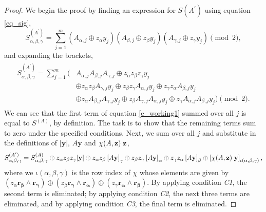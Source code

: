 \documentclass[notitlepage]{article}
\theoremstyle{definition}
\theoremstyle{problem}
\theoremstyle{lemma}
\begin{document}
		\begin{proof}
			We begin the proof by finding an expression for $S(A^\prime)$ using equation \ref{eq_sig},
			\begin{equation}
			S^{(A^\prime)}_{\alpha,\beta,\gamma} = \sum_{j=1}^{m}\left(A_{\alpha,j}\oplus z_\alpha y_j\right)\left(A_{\beta,j}\oplus z_\beta y_j\right)\left(A_{\gamma,j}\oplus z_\gamma y_j\right) \pmod{2},
			\end{equation}
			and expanding the brackets,
			\begin{align}
			\label{e_working1}
			\begin{split}
			S^{(A^\prime)}_{\alpha,\beta,\gamma} = \sum_{j=1}^{m}(&A_{\alpha,j}A_{\beta,j}A_{\gamma,j} \oplus z_\alpha z_\beta z_\gamma y_j  \\			
			&\oplus z_\alpha z_\beta A_{\gamma,j} y_j \oplus z_\beta z_\gamma A_{\alpha,j} y_j \oplus z_\gamma z_\alpha A_{\beta,j} y_j \\
			&\oplus z_\alpha A_{\beta,j} A_{\gamma,j} y_j \oplus z_\beta A_{\gamma,j} A_{\alpha,j} y_j \oplus z_\gamma A_{\alpha,j} A_{\beta,j} y_j) \pmod{2}.
			\end{split}
			\end{align}
			We can see that the first term of equation \ref{e_working1} summed over all $j$ is equal to $S^{(A)}$, by definition. The task is to show that the remaining terms sum to zero under the specified conditions. Next, we sum over all $j$ and substitute in the definitions of $|\mathbf{y}|$, $A\mathbf{y}$ and $\chi(A,\mathbf{z})\hspace{1mm}\mathbf{z}$,
			\begin{equation}
			S^{(A^\prime)}_{\alpha,\beta,\gamma} = S^{(A)}_{\alpha,\beta,\gamma} \oplus z_\alpha z_\beta z_\gamma |\mathbf{y}| \oplus z_\alpha z_\beta \left[A\mathbf{y}\right]_\gamma \oplus z_\beta z_\gamma \left[A\mathbf{y}\right]_\alpha \oplus z_\gamma z_\alpha \left[A\mathbf{y}\right]_\beta \oplus \left[\chi(A,\mathbf{z})\hspace{1mm}\mathbf{y}\right]_{\iota(\alpha,\beta,\gamma)},
			\end{equation}
			where we $\iota(\alpha,\beta,\gamma)$ is the row index of $\chi$ whose elements are given by $(z_\alpha\mathbf{r_\beta}\wedge\mathbf{r_\gamma})\oplus (z_\beta\mathbf{r_\gamma}\wedge\mathbf{r_\alpha})\oplus (z_\gamma\mathbf{r_\alpha}\wedge\mathbf{r_\beta})$.		
			By applying condition \emph{C1}, the second term is eliminated; by applying condition \emph{C2}, the next three terms are eliminated, and by applying condition \emph{C3}, the final term is eliminated.
		\end{proof}
	
\end{document}
